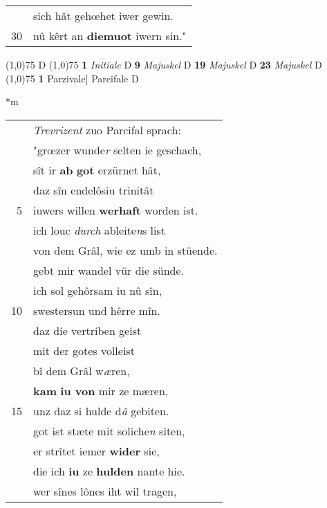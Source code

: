 \documentclass[8pt,a4paper,notitlepage]{article}
\begin{document}
\begin{table}[ht]
\begin{minipage}[t]{0.5\linewidth}
\begin{tabular}{rl}
 & sich hât gehœhet iwer gewin.\\ 
30 & nû kêrt an \textbf{diemuot} iwern sin."\\ 
\end{tabular}
\scriptsize
\line(1,0){75} \newline
D \newline
\line(1,0){75} \newline
\textbf{1} \textit{Initiale} D  \textbf{9} \textit{Majuskel} D  \textbf{19} \textit{Majuskel} D  \textbf{23} \textit{Majuskel} D  \newline
\line(1,0){75} \newline
\textbf{1} Parzivale] Parcifale D \newline
\end{minipage}
\hspace{0.5cm}
\begin{minipage}[t]{0.5\linewidth}
\small
\begin{center}*m
\end{center}
\begin{tabular}{rl}
 & \textit{Trevrizent} zuo Parcifal sprach:\\ 
 & "grœzer wunde\textit{r} selten ie geschach,\\ 
 & sît ir \textbf{ab} \textbf{got} erzürnet hât,\\ 
 & daz sîn endelôsiu trinitât\\ 
5 & iuwers willen \textbf{werhaft} worden ist.\\ 
 & ich louc \textit{durch} ableite\textit{n}s list\\ 
 & von dem Grâl, wie ez umb in stüende.\\ 
 & gebt mir wandel vür die sünde.\\ 
 & ich sol gehôrsam iu nû sîn,\\ 
10 & swestersun und hêrre mîn.\\ 
 & daz die vertriben geist\\ 
 & mit der gotes volleist\\ 
 & bî dem Grâl w\textit{æ}ren,\\ 
 & \textbf{kam} \textbf{iu von} mir ze mæren,\\ 
15 & unz daz si hulde d\textit{â} gebiten.\\ 
 & got ist stæte mit soliche\textit{n} siten,\\ 
 & er strîtet iemer \textbf{wider} sie,\\ 
 & die ich \textbf{iu} ze \textbf{hulden} nante hie.\\ 
 & wer sînes lônes iht wil tragen,\\ 

\end{tabular}
\end{minipage}
\end{table}
\end{document}
